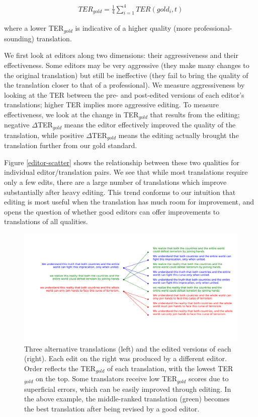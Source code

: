 \documentclass[11pt]{article}
\begin{document}
\begin{align}
TER_{gold} = \frac{1}{4}\sum\limits_{i = 1}^4 TER(gold_i, t)
\end{align}

where a lower TER$_{gold}$ is indicative of a higher quality (more professional-sounding) translation.


We first look at editors along two dimensions: their aggressiveness and their effectiveness. Some editors may be very aggressive (they make many changes to the original translation) but still be ineffective (they fail to bring the quality of the translation closer to that of a professional). We measure aggressiveness by looking at the TER between the pre- and post-edited versions of each editor's translations; higher TER implies more aggressive editing. To measure effectiveness, we look at the change in TER$_{gold}$ that results from the editing; negative $\Delta$TER$_{gold}$ means the editor effectively improved the quality of the translation, while positive $\Delta$TER$_{gold}$ means the editing actually brought the translation further from our gold standard.


Figure \ref{editor-scatter} shows the relationship between these two qualities for individual editor/translation pairs. We see that while most translations require only a few edits, there are a large number of translations which improve substantially after heavy editing. This trend conforms to our intuition that editing is most useful when the translation has much room for improvement, and opens the question of whether good editors can offer improvements to translations of all qualities.

\begin{figure}[ht!]
  \centering
  \includegraphics[width=\linewidth]{ter-rerank}
  \caption{Three alternative translations (left) and the edited versions of each (right). Each edit on the right was produced by a different editor. Order reflects the TER$_{gold}$ of each translation, with the lowest TER$_{gold}$ on the top. Some translators receive low TER$_{gold}$ scores due to superficial errors, which can be easily improved through editing. In the above example, the middle-ranked translation (green) becomes the best translation after being revised by a good editor.}
    \label{rerank}
\end{figure}
\end{document}
